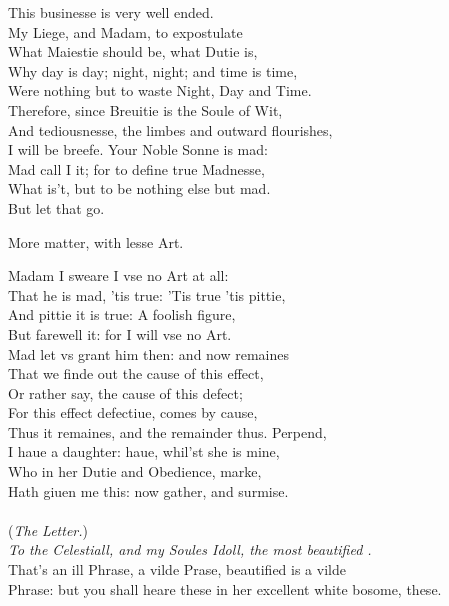 \documentclass[a5paper,DIV=calc,11pt]{scrbook}
\begin{document}
\begin{drama*}
    \polspeaks This businesse is very well ended.\\
    My Liege, and Madam, to expostulate\\
    What Maiestie should be, what Dutie is,\\
    Why day is day; night, night; and time is time,\\
    Were nothing but to waste Night, Day and Time.\\
    Therefore, since Breuitie is the Soule of Wit,\\
    And tediousnesse, the limbes and outward flourishes,\\
    I will be breefe. Your Noble Sonne is mad:\\
    Mad call I it; for to define true Madnesse,\\
    What is't, but to be nothing else but mad.\\
    But let that go.
    
    \queenspeaks More matter, with lesse Art.
    
    \polspeaks Madam I sweare I vse no Art at all:\\
    That he is mad, 'tis true: 'Tis true 'tis pittie,\\
    And pittie it is true: A foolish figure,\\
    But farewell it: for I will vse no Art.\\
    Mad let vs grant him then: and now remaines\\
    That we finde out the cause of this effect,\\
    Or rather say, the cause of this defect;\\
    For this effect defectiue, comes by cause,\\
    Thus it remaines, and the remainder thus. Perpend,\\
    I haue a daughter: haue, whil'st she is mine,\\
    Who in her Dutie and Obedience, marke,\\
    Hath giuen me this: now gather, and surmise.\\
    \mbox{}\\
    (\textit{The Letter.})\\
    \textit{To the Celestiall, and my Soules Idoll, the most beautified \ophe.}\\
    That's an ill Phrase, a vilde Prase, beautified is a vilde\\
    Phrase: but you shall heare these in her excellent white bosome, these.
    

\end{drama*}
\end{document}
